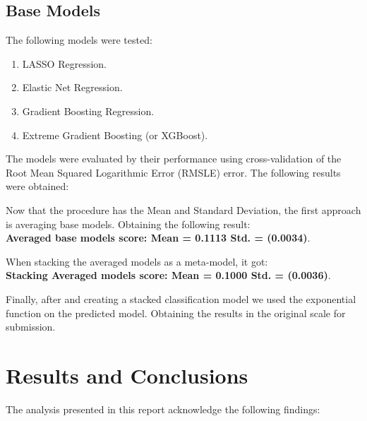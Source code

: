 \documentclass[
10pt, %
a4paper, %
oneside, %
headinclude,footinclude, %
BCOR5mm, %
]{scrartcl}
\begin{document}
\subsection{Base Models} 

The following models were tested:

\begin{enumerate}
\item LASSO Regression. 
\item Elastic Net Regression. 
\item Gradient Boosting Regression. 
\item Extreme Gradient Boosting (or XGBoost).
\end{enumerate}

The models were evaluated by their performance using cross-validation of the Root Mean Squared Logarithmic Error (RMSLE) error. The following results were obtained:



Now that the procedure has the Mean and Standard Deviation, the first approach is averaging base models. Obtaining the following result: \\ \textbf{Averaged base models score: Mean = 0.1113 Std. = (0.0034)}.

When stacking the averaged models as a meta-model, it got: \\ \textbf{Stacking Averaged models score: Mean = 0.1000 Std. = (0.0036)}.

Finally, after and creating a stacked classification model we used the exponential function on the predicted model. Obtaining the results in the original scale for submission.



\section{Results and Conclusions}

The analysis presented in this report acknowledge the following findings:
\end{document}
